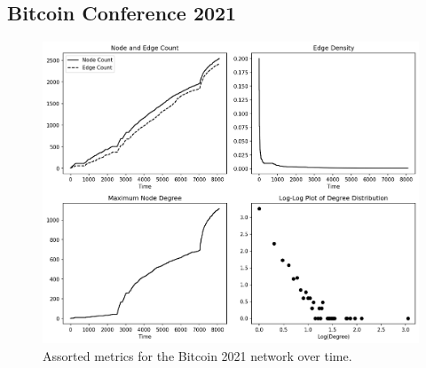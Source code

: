 \documentclass[a4paper,11pt]{article}
\begin{document}
\subsection{Bitcoin Conference 2021}
\begin{figure}[h!]
    \includegraphics[width=1.\linewidth]{Images/Bitcoin2021/graph_data.png}
    \centering
    \caption{Assorted metrics for the Bitcoin 2021 network over time.}
\end{figure}
\end{document}
